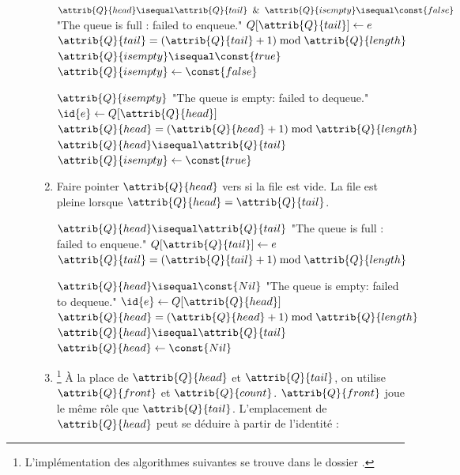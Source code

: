 \begin{description}
\begin{ex}
\begin{enumerate}[label=\circled{\arabic*}]
\begin{codebox}
    \li \If $\attrib{Q}{head}\isequal\attrib{Q}{tail} \And \attrib{Q}{isempty} \isequal \const{false}$ \Then
        \li \Error "The queue is full : failed to enqueue." \End
    \li  $Q[\attrib{Q}{tail}] \gets e$ 
    \li $\attrib{Q}{tail} = (\attrib{Q}{tail}+1)\bmod \attrib{Q}{length}$
    \li \If $\attrib{Q}{isempty} \isequal \const{true}$ \Then
      \li $\attrib{Q}{isempty} \gets \const{false}$ \End
\end{codebox}
\begin{codebox}
    \li \If $\attrib{Q}{isempty}$ \Then
        \li \Error "The queue is empty: failed to dequeue." \End
    \li  $\id{e} \gets Q[\attrib{Q}{head}]$ 
    \li $\attrib{Q}{head} = (\attrib{Q}{head}+1)\bmod \attrib{Q}{length}$
    \li \If $\attrib{Q}{head} \isequal \attrib{Q}{tail}$ \Then
      \li $\attrib{Q}{isempty} \gets \const{true}$ \End
    \li \Return {}
\end{codebox}
    \item Faire pointer $\attrib{Q}{head}$ vers  si la file est vide. La file est pleine lorsque $\attrib{Q}{head} = \attrib{Q}{tail}$.
\begin{codebox}
    \li \If $\attrib{Q}{head}\isequal\attrib{Q}{tail}$ \Then
        \li \Error "The queue is full : failed to enqueue." \End
    \li  $Q[\attrib{Q}{tail}] \gets e$ 
    \li $\attrib{Q}{tail} = (\attrib{Q}{tail}+1)\bmod \attrib{Q}{length}$
\end{codebox}
\begin{codebox}
    \li \If $\attrib{Q}{head}\isequal\const{Nil}$ \Then
        \li \Error "The queue is empty: failed to dequeue." \End
    \li  $\id{e} \gets Q[\attrib{Q}{head}]$ 
    \li $\attrib{Q}{head} = (\attrib{Q}{head}+1)\bmod \attrib{Q}{length}$
    \li \If $\attrib{Q}{head} \isequal \attrib{Q}{tail}$ \Then
      \li $\attrib{Q}{head} \gets \const{Nil}$ \End
    \li \Return {}
\end{codebox}
    \item \footnote{L'implémentation des algorithmes suivantes se trouve dans le dossier .}
    À la place de $\attrib{Q}{head}$ et $\attrib{Q}{tail}$, on utilise $\attrib{Q}{front}$ et $\attrib{Q}{count}$. $\attrib{Q}{front}$ joue le même rôle que $\attrib{Q}{tail}$. L'emplacement de $\attrib{Q}{head}$ peut se déduire à partir de l'identité :

\end{enumerate}
\end{ex}
\end{description}
